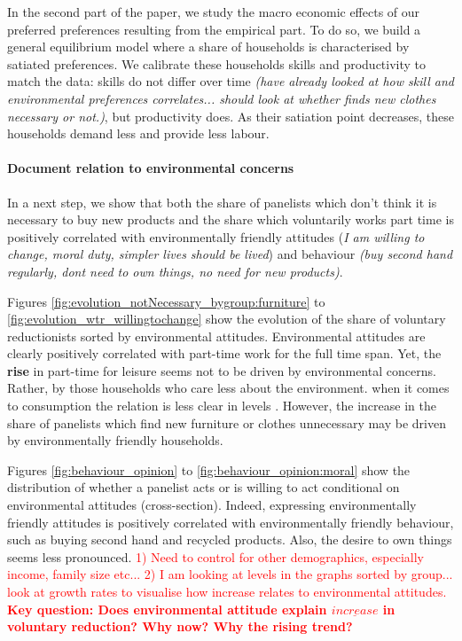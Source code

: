 \documentclass[12pt]{article}
\newcommand{\tr}[1]{\textcolor{red}{#1}}
\begin{document}
In the second part of the paper, we study the macro economic effects of our preferred preferences resulting from the empirical part. To do so, we build a general equilibrium model where a share of households is characterised by satiated preferences. We calibrate these households skills and productivity to match the data: skills do not differ over time \textit{(have already looked at how skill and environmental preferences correlates... should look at whether finds new clothes necessary or not.)}, but productivity does. 
As their satiation point decreases, these households demand less and provide less labour. 



\paragraph{Document relation to environmental concerns} 
In a next step, we show that both the share of panelists which don't think it is necessary to buy new products and the share which voluntarily works part time is positively correlated with environmentally friendly attitudes (\textit{I am willing to change, moral duty, simpler lives should be lived}) and behaviour \textit{(buy second hand regularly, dont need to own things, no need for new products)}.

Figures \ref{fig:evolution_notNecessary_bygroup:furniture} to \ref{fig:evolution_wtr_willingtochange} show the evolution of the share of voluntary reductionists sorted by environmental attitudes. 
Environmental attitudes are clearly positively correlated with part-time work for the full time span. Yet, the \textbf{rise} in part-time for leisure seems not to be driven by environmental concerns. Rather, by those households who care less about the environment. 
when it comes to consumption the relation is less clear in levels . However, the increase in the share of panelists which find new furniture or clothes unnecessary may be driven by environmentally friendly households. 

Figures \ref{fig:behaviour_opinion} to \ref{fig:behaviour_opinion:moral} show the distribution of whether a panelist acts or is willing to act conditional on environmental attitudes (cross-section). Indeed, expressing environmentally friendly attitudes is positively correlated with environmentally friendly behaviour, such as buying second hand and recycled products. Also, the desire to own things seems less pronounced.
\tr{1) Need to control for other demographics, especially income, family size etc...}
 \tr{2) I am looking at levels in the graphs sorted by group... look at growth rates to visualise how increase relates to environmental attitudes.} \textbf{\tr{Key question: Does environmental attitude explain $\underline{increase}$ in voluntary reduction? Why now? Why the rising trend?} }
\end{document}

